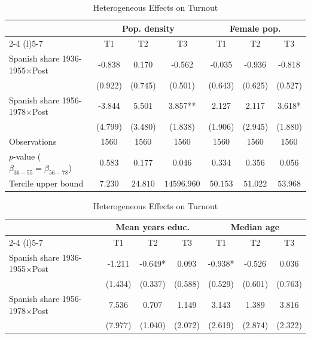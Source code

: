 \begin{table}[!h]
\centering
\renewcommand{\arraystretch}{1.05}
\setlength{\tabcolsep}{6pt}
\captionsetup{justification=centering}
\caption{Heterogeneous Effects on Turnout}
\begin{tabular*}{\textwidth}{l@{\extracolsep{\fill}}cccccc}
\hline
 & \multicolumn{3}{c}{Pop. density} & \multicolumn{3}{c}{Female pop.} \\
\cmidrule(l){2-4} \cmidrule(l){5-7}
  & T1 & T2 & T3 & T1  & T2  & T3 \\
\hline
Spanish share 1936-1955$\times$Post & -0.838 & 0.170 & -0.562 & -0.035 & -0.936 & -0.818\\
 & (0.922) & (0.745) & (0.501) & (0.643) & (0.625) & (0.527)\\
Spanish share 1956-1978$\times$Post & -3.844 & 5.501 & 3.857** & 2.127 & 2.117 & 3.618*\\
 & (4.799) & (3.480) & (1.838) & (1.906) & (2.945) & (1.880)\\

\addlinespace
Observations & 1560 & 1560 & 1560 & 1560 & 1560 & 1560\\
$p$-value ($\beta_{36{-}55} = \beta_{56{-}78}$) & 0.583 & 0.177 & 0.046 & 0.334 & 0.356 & 0.056\\
Tercile upper bound & $7.230$ & $24.810$ & $14596.960$ & $50.153$ & $51.022$ & $53.968$\\
\hline
\end{tabular*}
\begin{tabular*}{\textwidth}{l@{\extracolsep{\fill}}cccccc}
 & \multicolumn{3}{c}{Mean years educ.} & \multicolumn{3}{c}{Median age} \\
\cmidrule(l){2-4} \cmidrule(l){5-7}
  & T1 & T2 & T3 & T1  & T2  & T3 \\
\hline
Spanish share 1936-1955$\times$Post & -1.211 & -0.649* & 0.093 & -0.938* & -0.526 & 0.036\\
 & (1.434) & (0.337) & (0.588) & (0.529) & (0.601) & (0.763)\\
Spanish share 1956-1978$\times$Post & 7.536 & 0.707 & 1.149 & 3.143 & 1.389 & 3.816\\
 & (7.977) & (1.040) & (2.072) & (2.619) & (2.874) & (2.322)\\


\end{tabular*}
\end{table}
